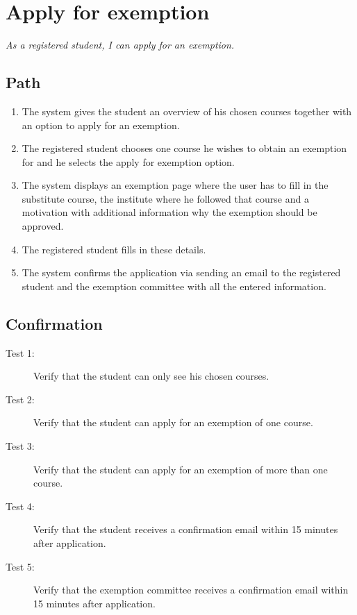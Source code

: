 \section{Apply for exemption}

\par \emph{As a registered student, I can apply for an exemption.}

\subsection{Path}

\begin{enumerate}
  \item The system gives the student an overview of his chosen courses together
  with an option to apply for an exemption.
  \item The registered student chooses one course he wishes to obtain an
  exemption for and he selects the apply for exemption option.
  \item The system displays an exemption page where the user has to fill in the
  substitute course, the institute where he followed that course and a
  motivation with additional information why the exemption should be approved.
  \item The registered student fills in these details.
  \item The system confirms the application via sending an email to the
  registered student and the exemption committee with all the entered information.
\end{enumerate}

\subsection{Confirmation}

\begin{description}
\item[Test 1:] Verify that the student can only see his chosen courses.
\item[Test 2:] Verify that the student can apply for an exemption of one course.
\item[Test 3:] Verify that the student can apply for an exemption of more than
one course.
\item[Test 4:] Verify that the student receives a confirmation email within 15
minutes after application.
\item[Test 5:] Verify that the exemption committee receives a confirmation email
within 15 minutes after application.
\end{description}



